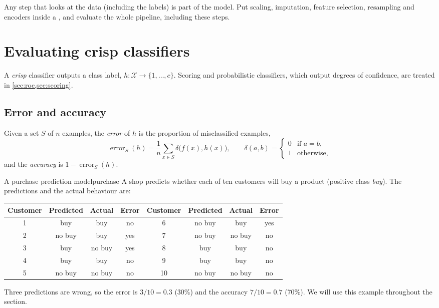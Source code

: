 \begin{pitfall}
Any step that looks at the data (including the labels) is part of the model. Put scaling,
imputation, feature selection, resampling and encoders inside a , and evaluate
the whole pipeline, including these steps.
\end{pitfall}

\section{Evaluating crisp classifiers}\label{sec:crisp}

A \emph{crisp} classifier outputs a class label, $h:\mathcal X\to\{1,\dots,c\}$. Scoring and
probabilistic classifiers, which output degrees of confidence, are treated in
\cref{sec:roc,sec:scoring}.

\subsection{Error and accuracy}

Given a set $S$ of $n$ examples, the \emph{error} of $h$ is the proportion of misclassified
examples,
\begin{equation}
  \operatorname{error}_S(h)=\frac1n\sum_{x\in S}\delta\bigl(f(x),h(x)\bigr),
  \qquad
  \delta(a,b)=\begin{cases}0 & \text{if } a=b,\\ 1 & \text{otherwise,}\end{cases}
\end{equation}
and the \emph{accuracy} is $1-\operatorname{error}_S(h)$.

\begin{example}{A purchase prediction model}{purchase}
A shop predicts whether each of ten customers will buy a product (positive class
\emph{buy}). The predictions and the actual behaviour are:
\begin{center}\small
\begin{tabular}{@{}cccc|cccc@{}}
\toprule
Customer & Predicted & Actual & Error & Customer & Predicted & Actual & Error\\
\midrule
1 & buy    & buy    & no  & 6  & no buy & buy    & yes\\
2 & no buy & buy    & yes & 7  & no buy & no buy & no\\
3 & buy    & no buy & yes & 8  & buy    & buy    & no\\
4 & buy    & buy    & no  & 9  & buy    & buy    & no\\
5 & no buy & no buy & no  & 10 & no buy & no buy & no\\
\bottomrule
\end{tabular}
\end{center}
Three predictions are wrong, so the error is $3/10=0.3$ (30\%) and the accuracy $7/10=0.7$
(70\%). We will use this example throughout the section.
\end{example}

